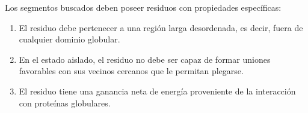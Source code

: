 Los segmentos buscados deben poseer residuos con propiedades específicas:
\begin{enumerate}
 \item El residuo debe pertenecer a una región larga desordenada, es decir, fuera de cualquier dominio globular.
 \item En el estado aislado, el residuo no debe ser capaz de formar uniones favorables con sus vecinos cercanos que le permitan plegarse.
 \item El residuo tiene una ganancia neta de energía proveniente de la interacción con proteínas globulares.
 \end{enumerate}


